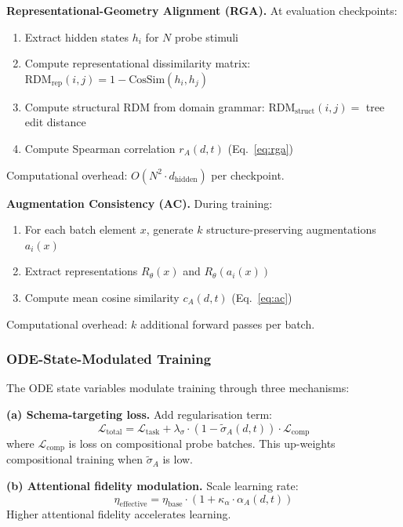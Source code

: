 \documentclass[11pt,a4paper]{article}
\begin{document}
\textbf{Representational-Geometry Alignment (RGA).} At evaluation checkpoints:
\begin{enumerate}[nosep]
\item Extract hidden states $h_i$ for $N$ probe stimuli
\item Compute representational dissimilarity matrix: $\text{RDM}_{\text{rep}}(i,j) = 1 - \text{CosSim}(h_i, h_j)$
\item Compute structural RDM from domain grammar: $\text{RDM}_{\text{struct}}(i,j) = $ tree edit distance
\item Compute Spearman correlation $r_A(d,t)$ (Eq.~\ref{eq:rga})
\end{enumerate}
Computational overhead: $O(N^2 \cdot d_{\text{hidden}})$ per checkpoint.

\textbf{Augmentation Consistency (AC).} During training:
\begin{enumerate}[nosep]
\item For each batch element $x$, generate $k$ structure-preserving augmentations $a_i(x)$
\item Extract representations $R_\theta(x)$ and $R_\theta(a_i(x))$
\item Compute mean cosine similarity $c_A(d,t)$ (Eq.~\ref{eq:ac})
\end{enumerate}
Computational overhead: $k$ additional forward passes per batch.

\subsubsection{ODE-State-Modulated Training}

The ODE state variables modulate training through three mechanisms:

\textbf{(a) Schema-targeting loss.} Add regularisation term:
\begin{equation}\label{eq:schema-loss}
\mathcal{L}_{\text{total}} = \mathcal{L}_{\text{task}} + \lambda_\sigma \cdot (1 - \tilde{\sigma}_A(d,t)) \cdot \mathcal{L}_{\text{comp}}
\end{equation}
where $\mathcal{L}_{\text{comp}}$ is loss on compositional probe batches.
This up-weights compositional training when $\tilde{\sigma}_A$ is low.

\textbf{(b) Attentional fidelity modulation.} Scale learning rate:
\begin{equation}\label{eq:lr-modulation}
\eta_{\text{effective}} = \eta_{\text{base}} \cdot (1 + \kappa_\alpha \cdot \alpha_A(d,t))
\end{equation}
Higher attentional fidelity accelerates learning.
\end{document}
